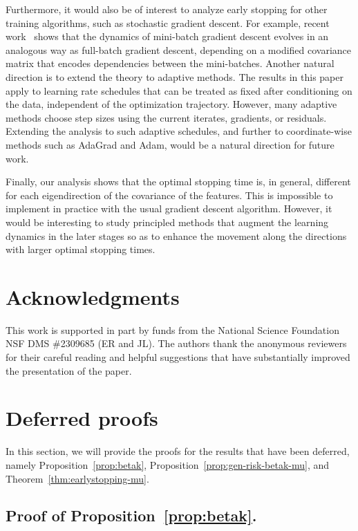 \documentclass[11pt]{article}
\begin{document}
Furthermore, it would also be of interest to analyze early stopping for other training algorithms, such as stochastic gradient descent. For example, recent work~\cite{LokSonthaliaRebrova2025} shows that the dynamics of mini-batch gradient descent evolves in an analogous way as full-batch gradient descent, depending on a modified covariance matrix that encodes dependencies between the mini-batches.
Another natural direction is to extend the theory to adaptive methods. The results in this paper apply to learning rate schedules that can be treated as fixed after conditioning on the data, independent of the optimization trajectory. However, many adaptive methods choose step sizes using the current iterates, gradients, or residuals. Extending the analysis to such adaptive schedules, and further to coordinate-wise methods such as AdaGrad and Adam, would be a natural direction for future work.

Finally, our analysis shows that the optimal stopping time is, in general, different for each eigendirection of the covariance of the features. This is impossible to implement in practice with the usual gradient descent algorithm. However, it would be interesting to study principled methods that augment the learning dynamics in the later stages so as to enhance the movement along the directions with larger optimal stopping times.


\section*{Acknowledgments}

This work is supported in part by funds from the National Science Foundation NSF DMS \#2309685 (ER and JL). The authors thank the anonymous reviewers for their careful reading and helpful suggestions that have substantially improved the presentation of the paper.


\printbibliography

\appendix

\section{Deferred proofs}
\label{app:deferred_proofs}

In this section, we will provide the proofs for the results that have been deferred, namely Proposition~\ref{prop:betak}, Proposition~\ref{prop:gen-risk-betak-mu}, and Theorem~\ref{thm:earlystopping-mu}.

\subsection{Proof of Proposition~\ref{prop:betak}.}
\end{document}
